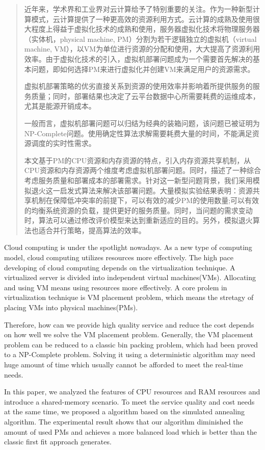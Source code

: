 \begin{abstract}
近年来，学术界和工业界对云计算给予了特别重要的关注。作为一种新型计算模式，云计算提供了一种更高效的资源利用方式。云计算的成熟及使用很大程度上得益于虚拟化技术的成熟和使用，服务器虚拟化技术将物理服务器（实体机，physical machine, PM）分割为若干逻辑独立的虚拟机（virtual machine, VM），以VM为单位进行资源的分配和使用，大大提高了资源利用效率。由于虚拟化技术的引入，虚拟机部署问题成为一个需要首先解决的基本问题，即如何选择PM来进行虚拟化并创建VM来满足用户的资源需求。

虚拟机部署策略的优劣直接关系到资源的使用效率并影响着所提供服务的服务质量；同时，部署结果也决定了云平台数据中心所需要耗费的运维成本，尤其是能源开销成本。

一般而言，虚拟机部署问题可以归结为经典的装箱问题，该问题已被证明为NP-Complete问题。使用确定性算法求解需要耗费大量的时间，不能满足资源调度的实时性需求。

本文基于PM的CPU资源和内存资源的特点，引入内存资源共享机制，从CPU资源和内存资源两个维度考虑虚拟机部署问题。同时，描述了一种综合考虑服务质量和部署成本的部署需求。针对这一新型问题背景，我们采用模拟退火这一启发式算法来解决该部署问题。大量模拟实验结果表明：资源共享机制在保障低冲突率的前提下，可以有效的减少PM的使用数量;可以有效的均衡系统资源的负载，提供更好的服务质量。同时，当问题的需求变动时，算法可以通过修改评价模型来达到重新适应的目的。另外，模拟退火算法也适合并行策略，提高算法的效率。
\end{abstract}


\begin{englishabstract}
Cloud computing is under the spotlight nowadays. As a new type of computing model, cloud computing utilizes resources more effectively. The high pace developing of cloud computing depends on the virtualization technique. A virtualized server is divided into independent virtual machines\thinspace(VMs). Allocating and using VM means using resources more effectively. A core prolem in virtualization technique is VM placement problem, which means the stretagy of placing VMs into physical machines\thinspace(PMs).

Therefore, how can we provide high quality service and reduce the cost depends on how well we solve the VM placement problem. Generally, the VM placement problem can be reduced to a classic bin packing problem, which had been proved to a NP-Complete problem. Solving it using a deterministic algorithm may need huge amount of time which usually cannot be afforded to meet the real-time needs.

In this paper, we analyzed the features of CPU resources and RAM resources and introduce a shared-memory scenario. To meet the service quality and cost needs at the same time, we proposed a algorithm based on the simulated annealing algorithm. The experimental result shows that our algorithm diminished the amount of used PMs and achieves a more balanced load which is better than the classic first fit approach generates.

\end{englishabstract}

\clearpage
